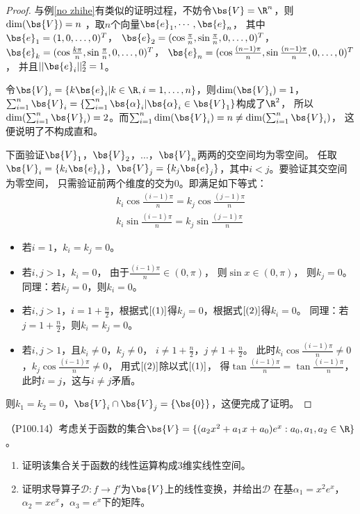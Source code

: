 \documentclass[12pt, a4paper, oneside, UTF8]{ctexbook}
\begin{document}
\begin{proof}
    与例\ref{no zhihe}有类似的证明过程，不妨令$\bs{V}=\R^n$，则$\mathrm{dim}(\bs{V})=n$
    ，取$n$个向量$\bs{e}_1,\cdots,\bs{e}_n$，
    其中
    $\bs{e}_1=(1,0,\ldots,0)^T$，
    $\bs{e}_2=(\cos \frac{\pi}{n},\sin \frac{\pi}{n},0,\ldots,0)^T$，
    $\bs{e}_k=(\cos \frac{k\pi}{n},\sin \frac{\pi}{n},0,\ldots,0)^T$，
    $\bs{e}_n=(\cos \frac{(n-1)\pi}{n},\sin \frac{(n-1)\pi}{n},0,\ldots,0)^T$，
    并且$||\bs{e}_i||_2^2=1$。

    令$\bs{V}_i=\{k\bs{e}_i|k\in\R,i=1,\ldots,n\}$，则$\mathrm{dim}(\bs{V}_i)=1$，
    $\sum_{i=1}^n \bs{V}_i=\{\sum_{i=1}^n \bs{\alpha}_i|\bs{\alpha}_i \in \bs{V}_1\}$构成了$\R^2$，
    所以$\mathrm{dim}(\sum_{i=1}^n \bs{V}_i)=2$。而$\sum_{i=1}^n \mathrm{dim}(\bs{V}_i)=n \neq \mathrm{dim}(\sum_{i=1}^n \bs{V}_i)$，
    这便说明了不构成直和。
    
    下面验证$\bs{V}_1$，$\bs{V}_2$，$\ldots$，$\bs{V}_n$两两的交空间均为零空间。
    任取$\bs{V}_i=\{k_i\bs{e}_i\}$，$\bs{V}_j=\{k_j\bs{e}_j\}$，其中$i < j$。要验证其交空间为零空间，
    只需验证前两个维度的交为0。即满足如下等式：
    \begin{align}
    k_i\cos \frac{(i-1)\pi}{n}=k_j \cos \frac{(j-1)\pi}{n} \label{(1)} \\
    k_i\sin \frac{(i-1)\pi}{n}=k_j \sin \frac{(j-1)\pi}{n} \label{(2)}
    \end{align}
\begin{itemize}
    \item 若$i=1$，$k_i=k_j=0$。
    \item 若$i,j>1$，$k_i=0$，
    由于$\frac{(i-1)\pi}{n} \in (0,\pi)$，
    则$\sin x \in (0,\pi)$，
    则$k_j=0$。同理：若$k_j=0$，则$k_i=0$。
    \item 若$i,j>1$，$i=1+\frac{n}{2}$，根据式$\ref{(1)}$得$k_j=0$，根据式$\ref{(2)}$得$k_i=0$。
    同理：若$j=1+\frac{n}{2}$，则$k_i=k_j=0$。
    \item 若$i,j>1$，且$k_i\neq 0$，$k_j \neq 0$，
    $i\neq 1+\frac{n}{2}$，$j \neq 1+\frac{n}{2}$。
    此时$k_i\cos \frac{(i-1)\pi}{n} \neq 0$，$k_j\cos \frac{(i-1)\pi}{n} \neq 0$，
    用式$\ref{(2)}$除以式$\ref{(1)}$，
    得$\tan \frac{(i-1)\pi}{n}=\tan \frac{(i-1)\pi}{n}$，此时$i= j$，这与$i \neq j$矛盾。
\end{itemize}
则$k_1=k_2=0$，$\bs{V}_i \cap \bs{V}_j =\{\bs{0}\}$，这便完成了证明。
\end{proof}


\begin{question}
    （P100.14）考虑关于函数的集合$\bs{V}=\{(a_2x^2+a_1x+a_0)e^x:a_0,a_1,a_2 \in \R\}$。
   \begin{enumerate}[label=(\arabic*)]
    \item 证明该集合关于函数的线性运算构成3维实线性空间。
    \item 证明求导算子$\mathcal{D}: f \rightarrow f'$为$\bs{V}$上的线性变换，并给出$\mathcal{D}$
    在基$\alpha_1=x^2e^x$，$\alpha_2=xe^x$，$\alpha_3=e^x$下的矩阵。
\end{enumerate}
\end{question}
\end{document}
